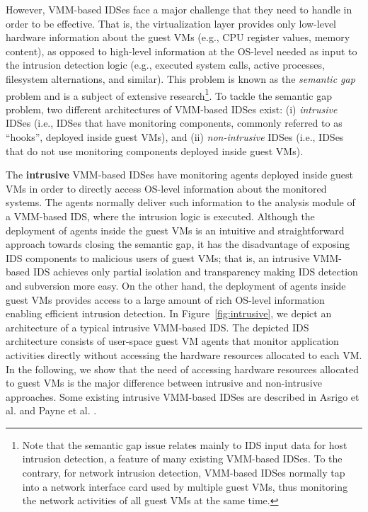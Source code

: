 However, VMM-based IDSes face a major challenge that they need to handle in order to be effective. That is, the virtualization layer provides only low-level hardware information about the guest VMs (e.g., CPU register values, memory content), as opposed to high-level information at the OS-level needed as input to the intrusion detection logic (e.g., executed system calls, active processes, filesystem alternations, and similar). This problem is known as the \emph{semantic gap} problem and is a subject of extensive research\footnote{Note that the semantic gap issue relates mainly to IDS input data for host intrusion detection, a feature of many existing VMM-based IDSes. To the contrary, for network intrusion detection, VMM-based IDSes normally tap into a network interface card used by multiple guest VMs, thus monitoring the network activities of all guest VMs at the same time.}. To tackle the semantic gap problem, two different architectures of VMM-based IDSes exist: (i) \emph{intrusive} IDSes (i.e., IDSes that have monitoring components, commonly referred to as ``hooks'', deployed inside guest VMs), and (ii) \emph{non-intrusive} IDSes (i.e., IDSes that do not use monitoring components deployed inside guest VMs). 


The \textbf{intrusive} VMM-based IDSes have monitoring agents deployed inside guest VMs in order to directly access OS-level information about the monitored systems. The agents normally deliver such information to the analysis module of a VMM-based IDS, where the intrusion logic is executed. Although the deployment of agents inside the guest VMs is an intuitive and straightforward approach towards closing the semantic gap, it has the disadvantage of exposing IDS components to malicious users of guest VMs; that is, an intrusive VMM-based IDS achieves only partial isolation and transparency making IDS detection and subversion more easy. On the other hand, the deployment of agents inside guest VMs provides access to a large amount of rich OS-level information enabling efficient intrusion detection. In Figure~\ref{fig:intrusive}, we depict an architecture of a typical intrusive VMM-based IDS. The depicted IDS architecture consists of user-space guest VM agents that monitor application activities directly without accessing the hardware resources allocated to each VM. In the following, we show that the need of accessing hardware resources allocated to guest VMs is the major difference between intrusive and non-intrusive approaches. Some existing intrusive VMM-based IDSes are described in Asrigo et al. \cite{asrigo:using} and Payne et al. \cite{payne:lares}. 


